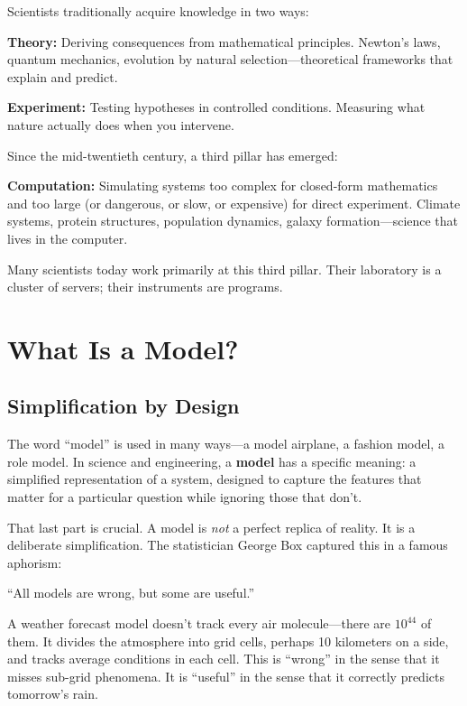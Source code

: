 \documentclass[11pt,letterpaper]{article}
\newcommand{\keyterm}[1]{\textbf{\textcolor{cssecondary}{#1}}}
\begin{document}
\begin{conceptbox}
Scientists traditionally acquire knowledge in two ways:

\textbf{Theory:} Deriving consequences from mathematical principles. Newton's laws, quantum mechanics, evolution by natural selection---theoretical frameworks that explain and predict.

\textbf{Experiment:} Testing hypotheses in controlled conditions. Measuring what nature actually does when you intervene.

Since the mid-twentieth century, a third pillar has emerged:

\textbf{Computation:} Simulating systems too complex for closed-form mathematics and too large (or dangerous, or slow, or expensive) for direct experiment. Climate systems, protein structures, population dynamics, galaxy formation---science that lives in the computer.

Many scientists today work primarily at this third pillar. Their laboratory is a cluster of servers; their instruments are programs.
\end{conceptbox}

\section{What Is a Model?}

\subsection{Simplification by Design}

The word ``model'' is used in many ways---a model airplane, a fashion model, a role model. In science and engineering, a \keyterm{model} has a specific meaning: a simplified representation of a system, designed to capture the features that matter for a particular question while ignoring those that don't.

That last part is crucial. A model is \textit{not} a perfect replica of reality. It is a deliberate simplification. The statistician George Box captured this in a famous aphorism:

\begin{quotebox}
``All models are wrong, but some are useful.''
\end{quotebox}

A weather forecast model doesn't track every air molecule---there are $10^{44}$ of them. It divides the atmosphere into grid cells, perhaps 10 kilometers on a side, and tracks average conditions in each cell. This is ``wrong'' in the sense that it misses sub-grid phenomena. It is ``useful'' in the sense that it correctly predicts tomorrow's rain.
\end{document}
